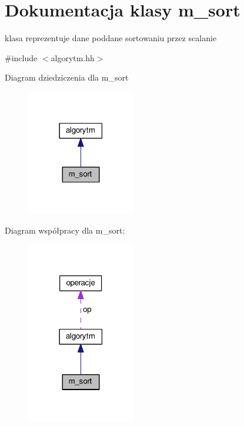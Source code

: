 \hypertarget{classm__sort}{\section{Dokumentacja klasy m\-\_\-sort}
\label{classm__sort}
}


klasa reprezentuje dane poddane sortowaniu przez scalanie  




{\ttfamily \#include $<$algorytm.\-hh$>$}



Diagram dziedziczenia dla m\-\_\-sort\nopagebreak
\begin{figure}[H]
\begin{center}
\leavevmode
\includegraphics[width=134pt]{classm__sort__inherit__graph}
\end{center}
\end{figure}


Diagram współpracy dla m\-\_\-sort\-:\nopagebreak
\begin{figure}[H]
\begin{center}
\leavevmode
\includegraphics[width=134pt]{classm__sort__coll__graph}
\end{center}
\end{figure}
